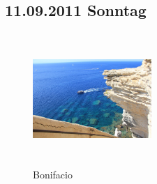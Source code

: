 \subsection{11.09.2011 Sonntag}
\begin{figure} 
  \begin{centering}
    \includegraphics[width=0.4\textwidth, height=5cm, keepaspectratio]{../Bilder/Korsika/38.jpg}
    \caption{Bonifacio}
  \end{centering}
\end{figure} 
